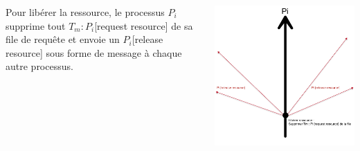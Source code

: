 \documentclass[compress]{beamer}
\begin{document}
\begin{frame}
		\begin{columns}
    	\begin{column}{.65\textwidth}
			Pour libérer la ressource, le processus $P_i$ supprime tout $T_m : P_i$[request resource] de sa file de requête et envoie un $P_i$[release resource] sous forme de message à chaque autre processus.
		\end{column}
		\begin{column}{.35\textwidth}
			\includegraphics[scale=0.13]{process10.png}
		\end{column}
	\end{columns}
\end{frame}
\end{document}
